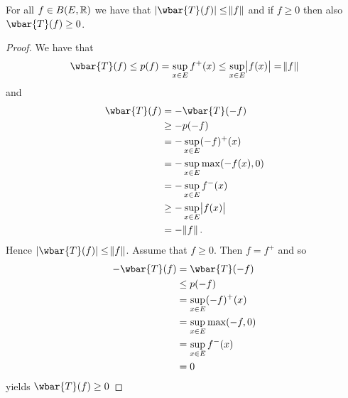 \begin{enumerate}[label = \textbf{Exercise \arabic*.},wide = 0pt, itemsep = 1.5ex]
		\begin{lemma}
			For all $f \in B(E,\mathbb{R})$ we have that $\abs[0]{\wbar{T}(f)} \leq \norm{f}$ and if $f \geq 0$ then also $\wbar{T}(f) \geq 0$.
		\end{lemma}
		\begin{proof}
			We have that
			\begin{equation*}
				\wbar{T}(f) \leq p(f) = \sup_{x \in E}f^+(x) \leq \sup_{x \in E}\abs{f(x)} = \norm{f}
			\end{equation*}
			\noindent and
			\begin{align*}
				\wbar{T}(f)
				&= -\wbar{T}(-f)\\
				&\geq -p(-f)\\
				&= -\sup_{x \in E}(-f)^+(x)\\
				&= - \sup_{x \in E}\max(-f(x),0)\\
				&= -\sup_{x \in E} f^-(x)\\
				&\geq -\sup_{x \in E} \abs{f(x)}\\
				&= -\norm{f}.
			\end{align*}
			Hence $\abs[0]{\wbar{T}(f)} \leq \norm{f}$. Assume that $f \geq 0$. Then $f = f^+$ and so
			\begin{align*}
				-\wbar{T}(f) &= \wbar{T}(-f)\\
				&\leq p(-f)\\
				&= \sup_{x \in E}(-f)^+(x)\\
				&= \sup_{x \in E}\max(-f,0)\\
				&= \sup_{x \in E}f^-(x)\\
				&= 0
			\end{align*}
			\noindent yields $\wbar{T}(f) \geq 0$
		\end{proof}
\end{enumerate}


